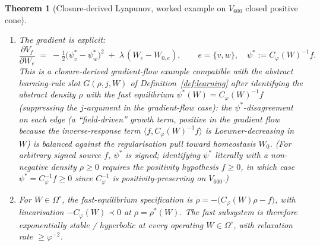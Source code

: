 \documentclass[11pt]{article}
\newtheorem{theorem}{Theorem}[section]
\theoremstyle{definition}
\begin{document}
\begin{theorem}[Closure-derived Lyapunov, worked example on $V_{600}$ closed positive cone]
\begin{enumerate}
\item The gradient is explicit:
\[
   \frac{\partial V_f}{\partial W_e} \;=\; -\tfrac{1}{2}\bigl(\psi^*_v - \psi^*_w\bigr)^{2} \;+\; \lambda\,(W_e - W_{0,e}),
   \qquad e = \{v, w\},\quad \psi^* := C_\varphi(W)^{-1} f.
\]
This is a closure-derived gradient-flow example compatible with the abstract learning-rule slot $G(\rho, j, W)$ of Definition~\ref{def:learning} after identifying the abstract density $\rho$ with the fast equilibrium $\psi^*(W) = C_\varphi(W)^{-1}f$ (suppressing the $j$-argument in the gradient-flow case): the $\psi^*$-disagreement on each edge (a ``field-driven'' growth term, positive in the gradient flow because the inverse-response term $\langle f, C_\varphi(W)^{-1} f\rangle$ is Loewner-decreasing in $W$) is balanced against the regularisation pull toward homeostasis $W_0$. (For arbitrary signed source $f$, $\psi^*$ is signed; identifying $\psi^*$ literally with a non-negative density $\rho \geq 0$ requires the positivity hypothesis $f \geq 0$, in which case $\psi^* = C_\varphi^{-1}f \geq 0$ since $C_\varphi^{-1}$ is positivity-preserving on $V_{600}$.)
\item For $W \in \Omega^\circ$, the fast-equilibrium specification is $\dot\rho = -\bigl(C_\varphi(W)\rho - f\bigr)$, with linearisation $-C_\varphi(W) \prec 0$ at $\rho = \rho^*(W)$. The fast subsystem is therefore exponentially stable / hyperbolic at every operating $W \in \Omega^\circ$, with relaxation rate $\geq \varphi^{-2}$.
\end{enumerate}
\end{theorem}
\end{document}
